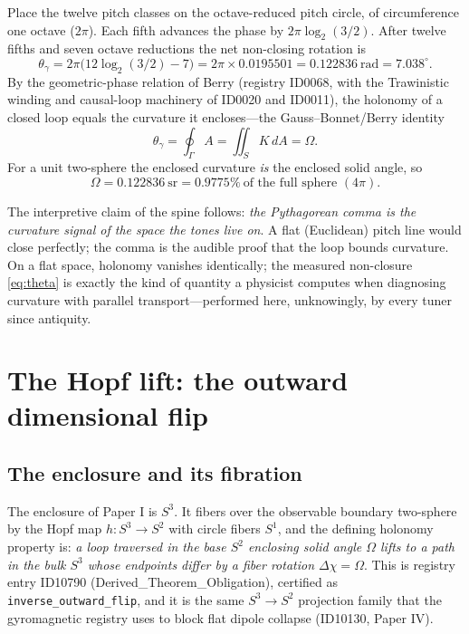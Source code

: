 \documentclass[11pt]{article}
\theoremstyle{remark}
\begin{document}
Place the twelve pitch classes on the octave-reduced pitch circle, of circumference one octave ($2\pi$). Each fifth advances the phase by $2\pi \log_2(3/2)$. After twelve fifths and seven octave reductions the net non-closing rotation is
\begin{equation}
\theta_\gamma = 2\pi\big(12 \log_2(3/2) - 7\big) = 2\pi \times 0.0195501 = 0.122836\ \text{rad} = 7.038^\circ.
\label{eq:theta}
\end{equation}
By the geometric-phase relation of Berry (registry ID0068, with the Trawinistic winding and causal-loop machinery of ID0020 and ID0011), the holonomy of a closed loop equals the curvature it encloses---the Gauss--Bonnet/Berry identity
\begin{equation}
\theta_\gamma = \oint_\Gamma A = \iint_S K\, dA = \Omega.
\label{eq:gaussbonnet}
\end{equation}
For a unit two-sphere the enclosed curvature \emph{is} the enclosed solid angle, so
\begin{equation}
\Omega = 0.122836\ \mathrm{sr} = 0.9775\%\ \text{of the full sphere } (4\pi).
\end{equation}

The interpretive claim of the spine follows: \emph{the Pythagorean comma is the curvature signal of the space the tones live on}. A flat (Euclidean) pitch line would close perfectly; the comma is the audible proof that the loop bounds curvature. On a flat space, holonomy vanishes identically; the measured non-closure \eqref{eq:theta} is exactly the kind of quantity a physicist computes when diagnosing curvature with parallel transport---performed here, unknowingly, by every tuner since antiquity.

\section{The Hopf lift: the outward dimensional flip}
\label{sec:hopf}

\subsection{The enclosure and its fibration}

The enclosure of Paper I is $S^3$. It fibers over the observable boundary two-sphere by the Hopf map $h: S^3 \to S^2$ with circle fibers $S^1$, and the defining holonomy property is: \emph{a loop traversed in the base $S^2$ enclosing solid angle $\Omega$ lifts to a path in the bulk $S^3$ whose endpoints differ by a fiber rotation $\Delta\chi = \Omega$}. This is registry entry ID10790 (Derived\_Theorem\_Obligation), certified as \texttt{inverse\_outward\_flip}, and it is the same $S^3 \to S^2$ projection family that the gyromagnetic registry uses to block flat dipole collapse (ID10130, Paper IV).
\end{document}
